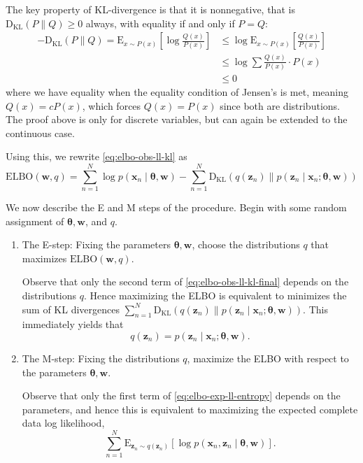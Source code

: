 The key property of KL-divergence is that it is nonnegative, that is $\mathrm{D}_{\text{KL}}(P \| Q) \geq 0$ always, with equality if and only if $P = Q$: 
\begin{align*}
    -\mathrm{D}_{\text{KL}}(P \| Q) = \mathrm{E}_{x \sim P(x)}\left[\log \frac{Q(x)}{P(x)}\right] &\leq \log \mathrm{E}_{x \sim P(x)} \left[\frac{Q(x)}{P(x)}\right] \\
    &\leq \log \sum \frac{Q(x)}{P(x)} \cdot P(x) \\
    &\leq 0
\end{align*}
where we have equality when the equality condition of Jensen's is met, meaning $Q(x) = cP(x)$, which forces $Q(x) = P(x)$ since both are distributions. The proof above is only for discrete variables, but can again be extended to the continuous case.

Using this, we rewrite \eqref{eq:elbo-obs-ll-kl} as
\begin{equation}
    \mathrm{ELBO}(\mathbf{w}, q) = \sum_{n = 1} ^N \log p(\mathbf{x}_n \mid \boldsymbol{\theta}, \mathbf{w}) - \sum_{n = 1} ^N \mathrm{D}_{\text{KL}} (q(\mathbf{z}_n) \| p(\mathbf{z}_n \mid \mathbf{x}_n; \boldsymbol{\theta}, \mathbf{w})) \label{eq:elbo-obs-ll-kl-final}
\end{equation}

We now describe the E and M steps of the procedure. Begin with some random assignment of $\boldsymbol{\theta}, \mathbf{w}$, and $q$.
\begin{enumerate}
    \item The E-step: Fixing the parameters $\boldsymbol{\theta}, \mathbf{w}$, choose the distributions $q$ that maximizes $\mathrm{ELBO}(\mathbf{w}, q)$. 
    
    Observe that only the second term of \eqref{eq:elbo-obs-ll-kl-final} depends on the distributions $q$. Hence maximizing the ELBO is equivalent to minimizes the sum of KL divergences $\sum_{n = 1} ^N \mathrm{D}_{\text{KL}} (q(\mathbf{z}_n) \| p(\mathbf{z}_n \mid \mathbf{x}_n; \boldsymbol{\theta}, \mathbf{w}))$. This immediately yields that \[q(\mathbf{z}_n) = p(\mathbf{z}_n \mid \mathbf{x}_n; \boldsymbol{\theta}, \mathbf{w}).\]

    \item The M-step: Fixing the distributions $q$, maximize the ELBO with respect to the parameters $\boldsymbol{\theta}, \mathbf{w}$. 
    
    Observe that only the first term of \eqref{eq:elbo-exp-ll-entropy} depends on the parameters, and hence this is equivalent to maximizing the expected complete data log likelihood, 
    \begin{equation}\label{eq:em-2-m-step}
        \sum_{n = 1} ^N \mathrm{E}_{\mathbf{z}_n \sim q(\mathbf{z}_n)} \left[\log p(\mathbf{x}_n, \mathbf{z}_n \mid \boldsymbol\theta, \mathbf{w})\right].
    \end{equation}
\end{enumerate}

